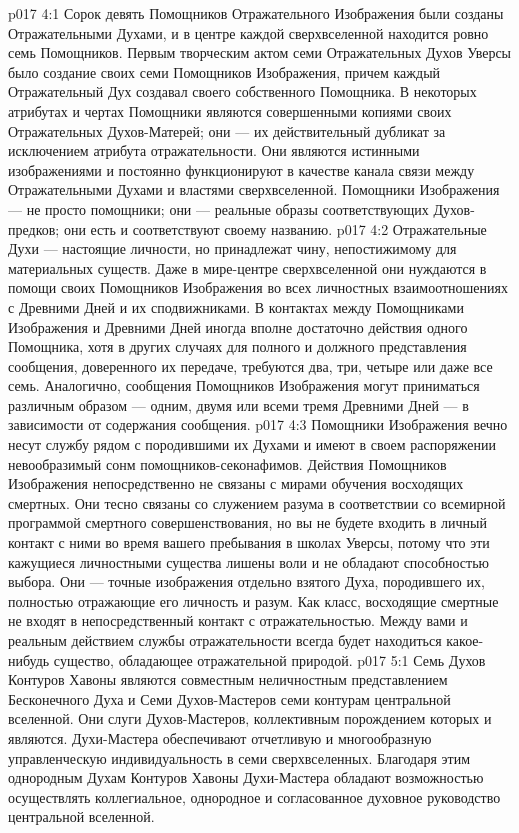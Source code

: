 \vs p017 4:1 Сорок девять Помощников Отражательного Изображения были созданы Отражательными Духами, и в центре каждой сверхвселенной находится ровно семь Помощников. Первым творческим актом семи Отражательных Духов Уверсы было создание своих семи Помощников Изображения, причем каждый Отражательный Дух создавал своего собственного Помощника. В некоторых атрибутах и чертах Помощники являются совершенными копиями своих Отражательных Духов\hyp{}Матерей; они --- их действительный дубликат за исключением атрибута отражательности. Они являются истинными изображениями и постоянно функционируют в качестве канала связи между Отражательными Духами и властями сверхвселенной. Помощники Изображения --- не просто помощники; они --- реальные образы соответствующих Духов\hyp{}предков; они есть  и соответствуют своему названию.
\vs p017 4:2 Отражательные Духи --- настоящие личности, но принадлежат чину, непостижимому для материальных существ. Даже в мире\hyp{}центре сверхвселенной они нуждаются в помощи своих Помощников Изображения во всех личностных взаимоотношениях с Древними Дней и их сподвижниками. В контактах между Помощниками Изображения и Древними Дней иногда вполне достаточно действия одного Помощника, хотя в других случаях для полного и должного представления сообщения, доверенного их передаче, требуются два, три, четыре или даже все семь. Аналогично, сообщения Помощников Изображения могут приниматься различным образом --- одним, двумя или всеми тремя Древними Дней --- в зависимости от содержания сообщения.
\vs p017 4:3 Помощники Изображения вечно несут службу рядом с породившими их Духами и имеют в своем распоряжении невообразимый сонм помощников\hyp{}секонафимов. Действия Помощников Изображения непосредственно не связаны с мирами обучения восходящих смертных. Они тесно связаны со служением разума в соответствии со всемирной программой смертного совершенствования, но вы не будете входить в личный контакт с ними во время вашего пребывания в школах Уверсы, потому что эти кажущиеся личностными существа лишены воли и не обладают способностью выбора. Они --- точные изображения отдельно взятого Духа, породившего их, полностью отражающие его личность и разум. Как класс, восходящие смертные не входят в непосредственный контакт с отражательностью. Между вами и реальным действием службы отражательности всегда будет находиться какое\hyp{}нибудь существо, обладающее отражательной природой.
\vs p017 5:1 Семь Духов Контуров Хавоны являются совместным неличностным представлением Бесконечного Духа и Семи Духов\hyp{}Мастеров семи контурам центральной вселенной. Они слуги Духов\hyp{}Мастеров, коллективным порождением которых и являются. Духи\hyp{}Мастера обеспечивают отчетливую и многообразную управленческую индивидуальность в семи сверхвселенных. Благодаря этим однородным Духам Контуров Хавоны Духи\hyp{}Мастера обладают возможностью осуществлять коллегиальное, однородное и согласованное духовное руководство центральной вселенной.

